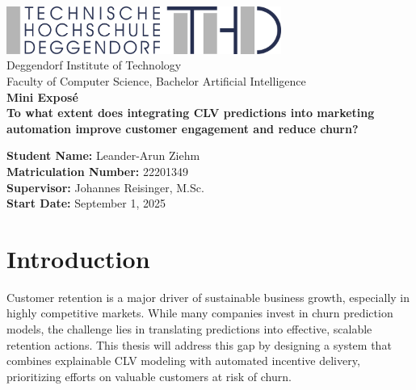 \documentclass[12pt,a4paper]{article}
\newcommand{\university}{Deggendorf Institute of Technology}
\newcommand{\faculty}{Faculty of Computer Science, Bachelor Artificial Intelligence}
\newcommand{\papertitle}{To what extent does integrating CLV predictions into marketing automation improve customer engagement and reduce churn?}
\newcommand{\authorname}{Leander-Arun Ziehm}
\newcommand{\studentid}{22201349}
\newcommand{\supervisor}{Johannes Reisinger, M.Sc.}
\newcommand{\submissiondate}{September 1, 2025}
\begin{document}
\begin{titlepage}
  \centering
  \vfill

  \includegraphics[width=9cm]{THD_Logo.jpg}\\[1cm]
  {\Large \university}\\
  {\large \faculty}\\[1.5cm]

  {\LARGE \textbf{Mini Exposé}}\\[1cm]
  {\LARGE \textbf{\papertitle}}\\[1.5cm]
  
  \begin{flushleft}
    \textbf{Student Name:} \authorname\\
    \textbf{Matriculation Number:} \studentid\\
    \textbf{Supervisor:} \supervisor\\
    \textbf{Start Date:} \submissiondate
  \end{flushleft}

  \vfill
\end{titlepage}

\begin{abstract}
Customer churn is a critical issue for subscription-based and transactional businesses, directly impacting revenue and growth. This thesis proposes to develop a rigorous, explainable, and actionable system for predicting Customer Lifetime Value (CLV) and preventing churn using company transactional and usage data. By leveraging classical statistical models such as BG/NBD and Gamma-Gamma, combined with rule-based churn heuristics and automated targeted incentives, the system aims to enable scalable, data-driven retention strategies. The project focuses on utilizing the existing company data store and product usage logs to build a transparent model that prioritizes high-value customers and optimizes incentive campaigns, while ensuring compliance with relevant data privacy regulations.
\end{abstract}

\section{Introduction}
Customer retention is a major driver of sustainable business growth, especially in highly competitive markets. While many companies invest in churn prediction models, the challenge lies in translating predictions into effective, scalable retention actions. This thesis will address this gap by designing a system that combines explainable CLV modeling with automated incentive delivery, prioritizing efforts on valuable customers at risk of churn.
\end{document}
